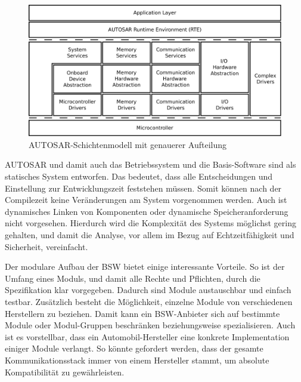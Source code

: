\documentclass[
  a4paper,					    %
  twoside,
  DIV=calc,     				%
  bibliography=totoc,
  cleardoublepage=empty,
  ngerman,     					%
  final       					%
]{scrbook}
\begin{document}
\begin{figure}[ht]
    \centering
    \includegraphics[width=1\textwidth]{autosar_refined_layer}
    \caption{AUTOSAR-Schichtenmodell mit genauerer Aufteilung}
    \label{fig:autosar_refined_layer}
\end{figure}

AUTOSAR und damit auch das Betriebssystem und die Basis-Software sind als statisches System entworfen. Das bedeutet, dass alle Entscheidungen und Einstellung zur Entwicklungszeit feststehen müssen. Somit können nach der Compilezeit keine Veränderungen am System vorgenommen werden. Auch ist dynamisches Linken von Komponenten oder dynamische Speicheranforderung nicht vorgesehen. Hierdurch wird die Komplexität des Systems möglichst gering gehalten, und damit die Analyse, vor allem im Bezug auf Echtzeitfähigkeit und Sicherheit, vereinfacht.\cite[Seite 186]{SE_Autosar}

Der modulare Aufbau der BSW bietet einige interessante Vorteile. So ist der Umfang eines Moduls, und damit alle Rechte und Pflichten, durch die Spezifikation klar vorgegeben. Dadurch sind Module austauschbar und einfach testbar. Zusätzlich besteht die Möglichkeit, einzelne Module von verschiedenen Herstellern zu beziehen. Damit kann ein BSW-Anbieter sich auf bestimmte Module oder Modul-Gruppen  beschränken beziehungsweise spezialisieren. Auch ist es vorstellbar, dass ein Automobil-Hersteller eine konkrete Implementation einiger Module verlangt. So könnte gefordert werden, dass der gesamte Kommunikationsstack immer von einem Hersteller stammt, um absolute Kompatibilität zu gewährleisten.
\end{document}
